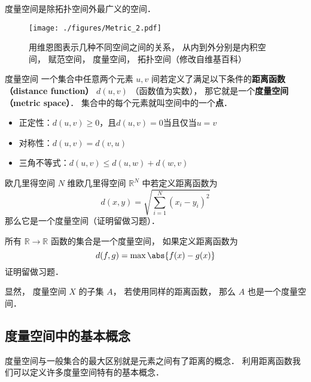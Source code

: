 

度量空间是除拓扑空间外最广义的空间．
\begin{figure}[ht]
\centering
\texttt{[image: ./figures/Metric\_2.pdf]}
\caption{用维恩图表示几种不同空间之间的关系， 从内到外分别是内积空间， 赋范空间， 度量空间， 拓扑空间（修改自维基百科）} \label{Metric_fig2}
\end{figure}

\begin{definition}{度量空间}
一个集合中任意两个元素 $u, v$ 间若定义了满足以下条件的\textbf{距离函数（distance function）} $d(u, v)$ （函数值为实数）， 那它就是一个\textbf{度量空间（metric space）}． 集合中的每个元素就叫空间中的一个\textbf{点}．
\begin{itemize}
\item 正定性：$d(u, v) \geq 0$，且$d(u, v)=0$当且仅当$u=v$
\item 对称性：$d(u, v) = d(v, u)$
\item 三角不等式：$d(u, v) \leqslant d(u, w) + d(w, v)$
\end{itemize}
\end{definition}

\begin{example}{欧几里得空间}
$N$ 维欧几里得空间 $\mathbb R^N$ 中若定义距离函数为
\begin{equation}
d(x, y) = \sqrt{\sum_{i=1}^N (x_i - y_i)^2}
\end{equation}
那么它是一个度量空间（证明留做习题）．
\end{example}

\begin{example}{}
所有 $\mathbb R \to \mathbb R$ 函数的集合是一个度量空间， 如果定义距离函数为
\begin{equation}
d(f, g) = \max{\abs{f(x) - g(x)}}
\end{equation}
证明留做习题．
\end{example}

显然， 度量空间 $X$ 的子集 $A$， 若使用同样的距离函数， 那么 $A$ 也是一个度量空间．

\subsection{度量空间中的基本概念}
度量空间与一般集合的最大区别就是元素之间有了距离的概念． 利用距离函数我们可以定义许多度量空间特有的基本概念．

